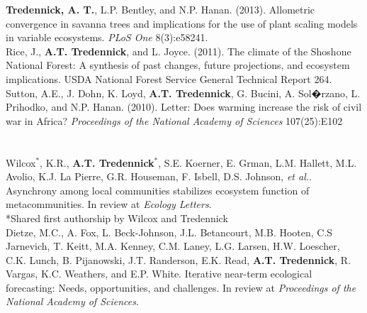 \documentclass[margin,line]{resume}
\begin{document}
\begin{resume}
	\textbf{Tredennick, A. T.}, L.P. Bentley, and N.P. Hanan. (2013). Allometric convergence in savanna trees and implications for the use of plant scaling models in 	variable ecosystems. \textsl{PLoS One} 8(3):e58241. \vspace{-6mm}\\%

   Rice, J., \textbf{A.T. Tredennick}, and L. Joyce. (2011). The climate of the Shoshone National Forest: A synthesis of past changes, future projections, and 			ecosystem implications. USDA National Forest Service General Technical Report 264. \vspace{-6mm}\\%
	
	Sutton, A.E., J. Dohn, K. Loyd, \textbf{A.T. Tredennick}, G. Bucini, A. Sol�rzano, L. Prihodko, and N.P. Hanan. (2010). Letter: Does warming increase the risk of civil war 	in Africa? \textsl{Proceedings of the National Academy of Sciences} 107(25):E102 \\ 
		
	\section{\textmd{\textsf{}}}
	Wilcox$^*$, K.R., \textbf{A.T. Tredennick}$^*$, S.E. Koerner, E. Grman, L.M. Hallett, M.L. Avolio, K.J. La Pierre, G.R. Houseman, F. Isbell, D.S. Johnson, \emph{et al.}. Asynchrony among local communities stabilizes ecosystem function of metacommunities. In review at \emph{Ecology Letters}. \\%
    \hspace{2em} \textsf{\footnotesize{*Shared first authorship by Wilcox and Tredennick}}  \vspace{-6mm}\\%
    
    Dietze, M.C., A. Fox, L. Beck-Johnson, J.L. Betancourt, M.B. Hooten, C.S Jarnevich, T. Keitt, M.A. Kenney, C.M. Laney, L.G. Larsen, H.W. Loescher, C.K. Lunch, B. Pijanowski, J.T. Randerson, E.K. Read, \textbf{A.T. Tredennick}, R. Vargas, K.C. Weathers, and E.P. White. Iterative near-term ecological forecasting: Needs, opportunities, and challenges. In review at \emph{Proceedings of the National Academy of Sciences}.
	

\end{resume}
\end{document}
